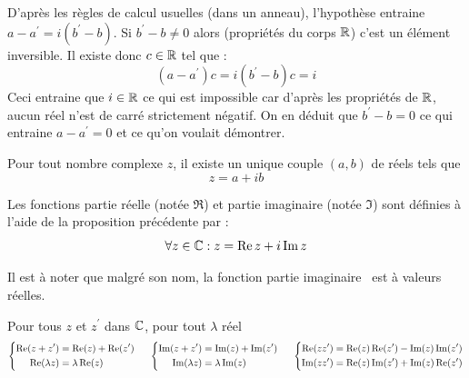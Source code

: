 \begin{demo}
 D'après les règles de calcul usuelles (dans un anneau), l'hypothèse entraine $a-a^\prime = i(b^\prime - b)$.\newline
Si $b^\prime - b \neq 0$ alors (propriétés du corps $\R$) c'est un élément inversible. Il existe donc $c\in \R$ tel que :
\begin{displaymath}
 (a-a^\prime)c=i(b^\prime - b)c=i
\end{displaymath}
 Ceci entraine que $i\in \R$ ce qui est impossible car d'après les propriétés de $\R$, aucun réel n'est de carré strictement négatif. On en déduit que $b^\prime - b = 0$ ce qui entraine $a - a^\prime = 0$ et ce qu'on voulait démontrer.
\end{demo}
\begin{prop}
 Pour tout nombre complexe $z$, il existe un unique couple $(a,b)$ de réels tels que 
\begin{displaymath}
 z = a + i b
\end{displaymath}
\end{prop}
\begin{defi}
Les fonctions partie réelle (notée $\Re$) et partie imaginaire (notée $\Im$) sont définies à l'aide de la proposition précédente par :
\begin{displaymath}
 \forall z \in \C : z =\Re z + i \Im z
\end{displaymath}
\end{defi}
Il est à noter que malgré son nom, la fonction \og partie imaginaire\fg~  est à valeurs réelles.
\begin{prop} 
 Pour tous $z$ et  $z^\prime$ dans $\C$, pour tout $\lambda$ réel
\begin{displaymath}
\left\lbrace 
\begin{aligned}
 \Re (z + z^\prime) &= \Re (z) + \Re(z^\prime) \\ \Re(\lambda z) &= \lambda \Re(z)
\end{aligned}
\right. 
\hspace{0.5cm}
\left\lbrace 
\begin{aligned}
 \Im (z + z^\prime) &= \Im (z) + \Im(z^\prime) \\  \Im(\lambda z) &= \lambda \Im(z)
\end{aligned}
\right. 
\hspace{0.5cm}
\left\lbrace 
\begin{aligned}
 \Re (z  z^\prime) &= \Re (z) \Re(z^\prime) - \Im (z) \Im(z^\prime) \\
 \Im(z z') &= \Re(z)\Im(z')+\Im(z)\Re(z')
\end{aligned}
\right. 
\end{displaymath}
\end{prop}
